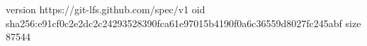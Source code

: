 version https://git-lfs.github.com/spec/v1
oid sha256:e91cf0c2e2dc2c24293528390fca61e97015b4190f0a6c36559d8027fc245abf
size 87544

